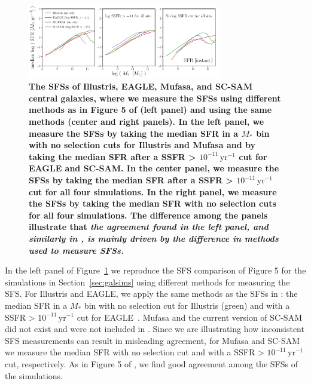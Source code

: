 \documentclass[tighten, preprint]{aastex62}
\begin{document}
\begin{figure}
\begin{center}
\includegraphics[width=0.75\textwidth]{Catalog_SFS_lit.pdf} 
\caption{\bf \color{red} The SFSs of Illustris, EAGLE, {\sc Mufasa}, 
and SC-SAM central galaxies, where we measure the SFSs using 
different methods as in Figure 5  of \cite{somerville2015} (left panel) 
and using the same methods (center and right panels). In the left panel, 
we measure the SFSs by taking the median SFR in  a $M_*$ bin with no 
selection cuts for Illustris and {\sc Mufasa} and by taking the median 
SFR after a SSFR > $10^{-11}\, \mathrm{yr}^{-1}$ cut for EAGLE and SC-SAM. 
In the center panel, we measure the SFSs by taking the median SFR after 
a SSFR > $10^{-11}\,\mathrm{yr}^{-1}$ cut for all four simulations. 
In the right panel, we measure the SFSs by taking the median SFR with 
no selection cuts for all four simulations. The difference among the 
panels illustrate that \emph{the agreement found in the left panel, 
and similarly in \cite{somerville2015}, is mainly driven by the 
difference in methods used to measure SFSs.}} 
\label{fig:likeSD14}
\end{center}
\end{figure}

In the left panel of Figure~\ref{fig:likeSD14} we reproduce the SFS comparison of 
\cite{somerville2015} Figure 5 for the simulations in Section~\ref{sec:galsims}
using different methods for measuring the SFS. For Illustris and EAGLE, we apply
the same methods as the SFSs in \cite{somerville2015}: 
the median SFR in a $M_*$ bin with no selection cut for Illustris (green) and 
with a SSFR > $10^{-11}\, \mathrm{yr}^{-1}$ cut for EAGLE~\citep[red;][]{schaye2015}. 
{\sc Mufasa} and the current version of SC-SAM did not exist and were not 
included in \cite{somerville2015}. Since we are illustrating how inconsistent 
SFS measurements can result in misleading agreement, for {\sc Mufasa} and 
SC-SAM we measure the median SFR with no selection cut and with a SSFR > 
$10^{-11}\, \mathrm{yr}^{-1}$ cut, respectively. As in Figure 5 of \cite{somerville2015}, 
we find good agreement among the SFSs of the simulations. 
\end{document}
